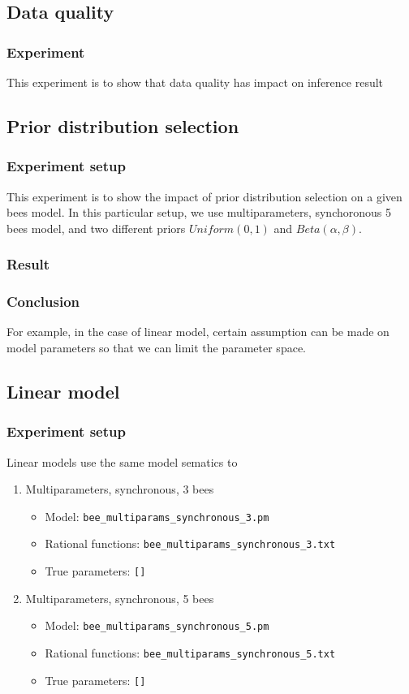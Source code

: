 \documentclass[12pt]{article}
\theoremstyle{definition}
\begin{document}
\subsection{Data quality}
\subsubsection{Experiment}
This experiment is to show that data quality has impact on inference result


\subsection{Prior distribution selection}
\subsubsection{Experiment setup}
This experiment is to show the impact of prior distribution selection on a given
bees model. In this particular setup, we use multiparameters, synchoronous 5
bees model, and two different priors $Uniform(0,1)$ and $Beta(\alpha, \beta)$.


\subsubsection{Result}

\subsubsection{Conclusion}
For example, in the case of linear model, certain assumption can be made on
model parameters so that we can limit the parameter space. 

\subsection{Linear model}
\subsubsection{Experiment setup}
Linear models use the same model sematics to 
\begin{enumerate}
\item Multiparameters, synchronous, 3 bees
  \begin{itemize}
  \item Model: \texttt{bee\_multiparams\_synchronous\_3.pm}
  \item Rational functions: \texttt{bee\_multiparams\_synchronous\_3.txt}
  \item True parameters: \texttt{[]}
  \end{itemize}
\item Multiparameters, synchronous, 5 bees
  \begin{itemize}
  \item Model: \texttt{bee\_multiparams\_synchronous\_5.pm}
  \item Rational functions: \texttt{bee\_multiparams\_synchronous\_5.txt}
  \item True parameters: \texttt{[]}
  \end{itemize}
\end{enumerate}
\end{document}
